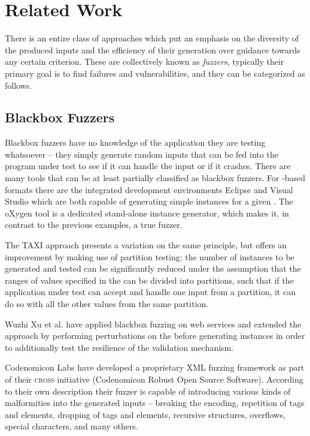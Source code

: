 \section{Related Work}
\label{sec:relwork}
There is an entire class of approaches which put an emphasis on the diversity of the produced inputs and the
efficiency of their generation over guidance towards any certain criterion. These are collectively known as
\emph{fuzzers}, typically their primary goal is to find failures and vulnerabilities, and they can be
categorized as follows.
\subsection{Blackbox Fuzzers}
Blackbox fuzzers have no knowledge of the application they are testing whatsoever -- they simply generate random
inputs that can be fed into the program under test to see if it can handle the input or if it crashes.
There are many tools that can be at least partially classified as blackbox fuzzers. For \xml-based formats
there are the integrated development environments Eclipse\cite{eclipse} and Visual Studio\cite{visual} which
are both capable of generating simple instances for a given \xsd. The oXygen\cite{oxygen} tool is a
dedicated stand-alone \xml instance generator, which makes it, in contrast to the previous examples, a true
fuzzer.
 		 
The TAXI\cite{Bertolino:2007:ATD:1270230.1270257} approach presents a variation on the same principle, but
offers an improvement by making use of partition testing: the number of instances to be generated
and tested can be significantly reduced under the assumption that the ranges of values specified in the \xsd
can be divided into partitions, such that if the application under test can accept and handle one input from a
partition, it can do so with all the other values from the same partition.

Wuzhi Xu et al.\cite{1544740} have applied blackbox fuzzing on web services and extended the approach by
performing perturbations on the \xsd before generating instances in order to additionally test the resilience
of the validation mechanism.

Codenomicon Labs have developed a proprietary XML fuzzing framework\cite{codenomicon} as part of their
\textsc{cross} initiative (Codenomicon Robust Open Source Software). According to their own description their
fuzzer is capable of introducing various kinds of malformities into the generated inputs -- breaking the
encoding, repetition of tags and elements, dropping of tags and elements, recursive structures, overflows,
special characters, and many others.

